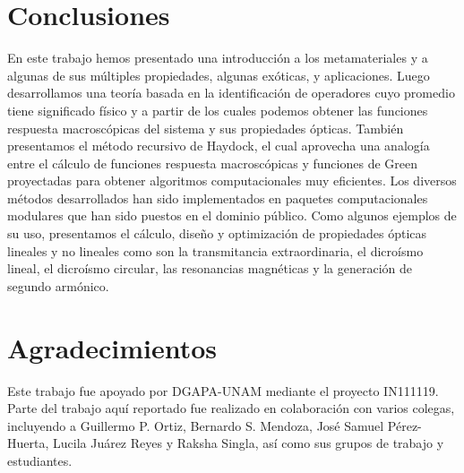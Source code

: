 \documentclass[12pt]{article}
\begin{document}
\section{Conclusiones}
En este trabajo hemos presentado una introducción a los metamateriales
y a algunas de sus múltiples propiedades, algunas exóticas, y
aplicaciones. Luego desarrollamos una teoría basada en la
identificación de operadores cuyo promedio tiene significado físico y
a partir de los cuales podemos obtener las funciones respuesta
macroscópicas del sistema y sus propiedades ópticas. También
presentamos el método recursivo de Haydock, el cual aprovecha una
analogía entre el cálculo de funciones respuesta macroscópicas y
funciones de Green proyectadas para obtener algoritmos computacionales
muy eficientes. Los diversos métodos desarrollados han sido
implementados en paquetes computacionales modulares que han sido
puestos en el dominio público. Como algunos ejemplos de su uso,
presentamos el cálculo, diseño y optimización de propiedades ópticas
lineales y no lineales como son la transmitancia
extraordinaria, el dicroísmo lineal, el dicroísmo circular, las
resonancias magnéticas y la generación de segundo armónico.

\section{Agradecimientos}
Este trabajo fue apoyado por DGAPA-UNAM mediante el proyecto IN111119.
Parte del trabajo aquí reportado fue realizado en colaboración con varios
colegas, incluyendo a Guillermo P. Ortiz, Bernardo S. Mendoza, José
Samuel Pérez-Huerta, Lucila Juárez Reyes y Raksha Singla, así como sus
grupos de trabajo y estudiantes.
\end{document}
